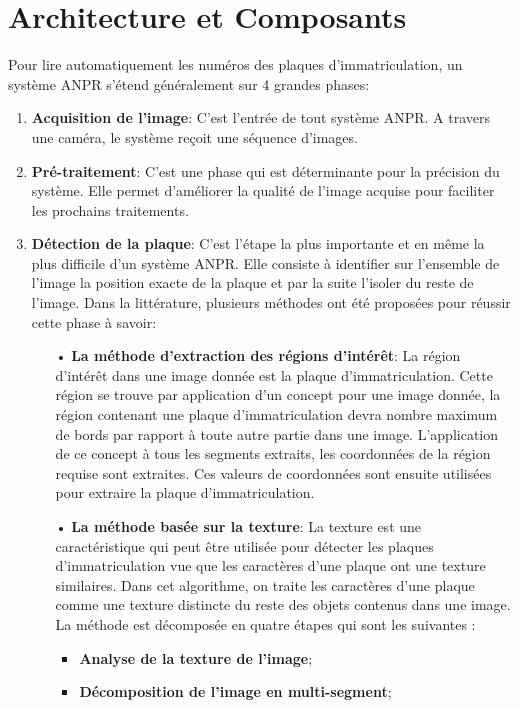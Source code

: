 \section{Architecture et Composants}
Pour lire automatiquement les numéros des plaques d’immatriculation, un système ANPR s’étend généralement sur 4 grandes phases:
\begin{enumerate}
    \item \textbf{Acquisition de l’image}: C’est l’entrée de tout système ANPR. A travers une caméra, le système reçoit une séquence d’images.
    \item \textbf{Pré-traitement}: C’est une phase qui est déterminante pour la précision du système. Elle permet d’améliorer la qualité de l’image acquise pour faciliter les prochains traitements.
    \item \textbf{Détection de la plaque}: C’est l’étape la plus importante et en même la plus difficile d’un système ANPR. Elle consiste à identifier sur l’ensemble de l’image la position exacte de la plaque et par la suite l’isoler du reste de l’image. Dans la littérature, plusieurs méthodes ont été proposées pour réussir cette phase à savoir:
        \begin{itemize}
            \item[•] \textbf{La méthode d’extraction des régions d’intérêt}: La région d'intérêt dans une image donnée est la plaque d'immatriculation. Cette région se trouve par
            application d'un concept pour une image donnée, la région contenant une plaque d'immatriculation devra
            nombre maximum de bords par rapport à toute autre partie dans une image. L’application de ce concept à
            tous les segments extraits, les coordonnées de la région requise sont extraites. Ces valeurs de coordonnées
            sont ensuite utilisées pour extraire la plaque d'immatriculation.
            \item[•] \textbf{La méthode basée sur la texture}: La texture est une caractéristique qui peut être utilisée pour détecter les plaques d’immatriculation vue
            que les caractères d’une plaque ont une texture similaires. Dans cet algorithme, on traite les caractères
            d’une plaque comme une texture distincte du reste des objets contenus dans une image. La méthode est
            décomposée en quatre étapes qui sont les suivantes :
                \begin{itemize}
                    \item \textbf{Analyse de la texture de l’image};
                    \item \textbf{Décomposition de l’image en multi-segment};

\end{itemize}
\end{itemize}
\end{enumerate}
